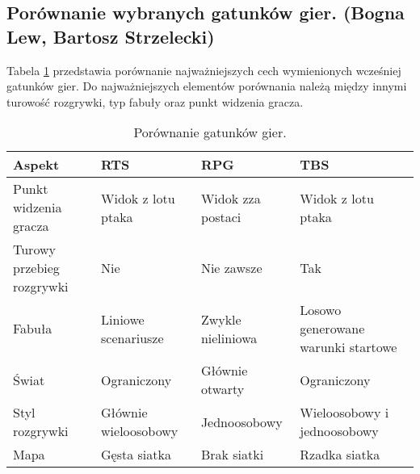 \subsection{Porównanie wybranych gatunków gier. (Bogna Lew, Bartosz Strzelecki)}\label{ss:comp}
Tabela \ref{fig:por_gier} przedstawia porównanie najważniejszych cech wymienionych wcześniej gatunków gier. Do
najważniejszych elementów porównania należą między innymi turowość rozgrywki, typ fabuły oraz punkt widzenia gracza.

\begin{table}[h]
\caption{Porównanie gatunków gier.}
\begin{center}
\begin{tabular}{| m{11em} | m{10em} | m{10em} | m{10em}|} 
 \hline
 Aspekt & RTS & RPG & TBS \\
 \hline \hline
 Punkt widzenia gracza & Widok z lotu ptaka & Widok zza postaci & Widok z lotu ptaka \\
 \hline
 Turowy przebieg rozgrywki & Nie & Nie zawsze & Tak \\
 \hline
 Fabuła & Liniowe scenariusze & Zwykle nieliniowa & Losowo generowane warunki startowe \\
 \hline
 Świat & Ograniczony & Głównie otwarty & Ograniczony \\
 \hline
 Styl rozgrywki & Głównie wieloosobowy & Jednoosobowy & Wieloosobowy i jednoosobowy \\
 \hline
 Mapa & Gęsta siatka & Brak siatki & Rzadka siatka \\
 \hline
\end{tabular}
\end{center}
\label{fig:por_gier}
\end{table}
